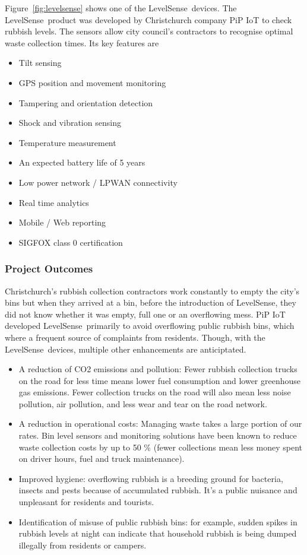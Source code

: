 \documentclass[10pt]{article}
\begin{document}
Figure~\ref{fig:levelsense} shows one of the LevelSense\texttrademark ~devices.
The LevelSense\texttrademark ~product was developed by Christchurch company PiP IoT to check rubbish levels. The sensors allow city council’s contractors to recognise optimal waste collection times. Its key features are
\begin{itemize}
\item Tilt sensing 
\item GPS position and movement monitoring
\item Tampering and orientation detection
\item Shock and vibration sensing
\item Temperature measurement
\item An expected battery life of 5 years
\item Low power network / LPWAN connectivity
\item Real time analytics
\item Mobile / Web reporting
\item SIGFOX class 0 certification
\end{itemize} 

\subsubsection{Project Outcomes}

Christchurch's rubbish collection contractors work constantly to empty the city's bins 
but when they arrived at a bin, before the introduction of LevelSense\texttrademark, they did not know whether it was empty, full one or an overflowing mess. 
PiP IoT developed LevelSense\texttrademark ~primarily to avoid overflowing public 
rubbish bins, which where a frequent source of complaints from residents.
Though, with the LevelSense\texttrademark ~devices, multiple other enhancements 
are anticiptated.

\begin{itemize}
	\item
	A reduction of CO2 emissions and pollution: Fewer rubbish collection trucks on the road for less time means lower fuel consumption and lower greenhouse gas emissions. Fewer collection trucks on the road will also mean less noise pollution, air pollution, and less wear and tear on the road network.
	\item
	A reduction in operational costs: Managing waste takes a large portion of our rates. Bin level sensors and monitoring solutions have been known to reduce waste collection costs by up to 50 \% (fewer collections mean less money spent on driver hours, fuel and truck maintenance).
	\item
	Improved hygiene: overflowing rubbish is a breeding ground for bacteria, insects and pests because of accumulated rubbish. It’s a public nuisance and unpleasant for residents and tourists.
	\item
	Identification of misuse of public rubbish bins: for example, sudden spikes in rubbish levels at night can indicate that household rubbish is being dumped illegally from residents or campers. 
\end{itemize}
\end{document}
